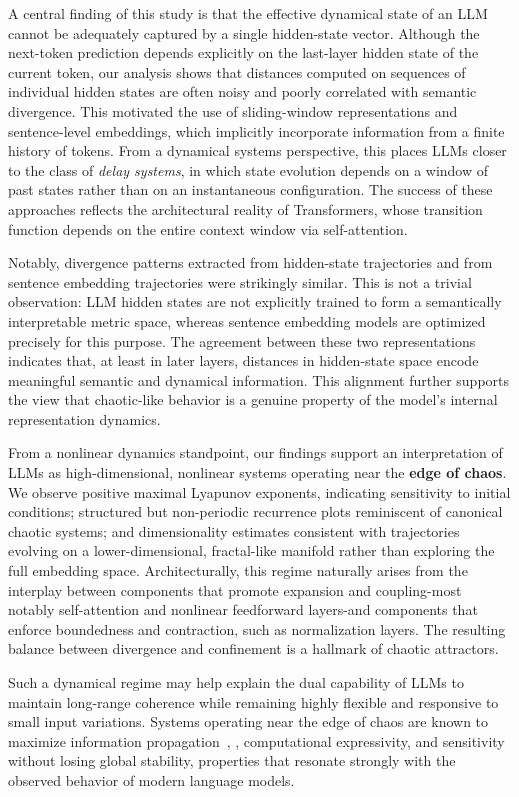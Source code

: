 \documentclass[aip%
 aip,
 amsmath,amssymb,
 reprint,%
]{revtex4-1}
\begin{document}
A central finding of this study is that the effective dynamical state of an LLM cannot be adequately captured by a single hidden-state vector. Although the next-token prediction depends explicitly on the last-layer hidden state of the current token, our analysis shows that distances computed on sequences of individual hidden states are often noisy and poorly correlated with semantic divergence. This motivated the use of sliding-window representations and sentence-level embeddings, which implicitly incorporate information from a finite history of tokens. From a dynamical systems perspective, this places LLMs closer to the class of \emph{delay systems}, in which state evolution depends on a window of past states rather than on an instantaneous configuration. The success of these approaches reflects the architectural reality of Transformers, whose transition function depends on the entire context window via self-attention.

Notably, divergence patterns extracted from hidden-state trajectories and from sentence embedding trajectories were strikingly similar. This is not a trivial observation: LLM hidden states are not explicitly trained to form a semantically interpretable metric space, whereas sentence embedding models are optimized precisely for this purpose. The agreement between these two representations indicates that, at least in later layers, distances in hidden-state space encode meaningful semantic and dynamical information. This alignment further supports the view that chaotic-like behavior is a genuine property of the model’s internal representation dynamics.

From a nonlinear dynamics standpoint, our findings support an interpretation of LLMs as high-dimensional, nonlinear systems operating near the \textbf{edge of chaos}. We observe positive maximal Lyapunov exponents, indicating sensitivity to initial conditions; structured but non-periodic recurrence plots reminiscent of canonical chaotic systems; and dimensionality estimates consistent with trajectories evolving on a lower-dimensional, fractal-like manifold rather than exploring the full embedding space. Architecturally, this regime naturally arises from the interplay between components that promote expansion and coupling-most notably self-attention and nonlinear feedforward layers-and components that enforce boundedness and contraction, such as normalization layers. The resulting balance between divergence and confinement is a hallmark of chaotic attractors.

Such a dynamical regime may help explain the dual capability of LLMs to maintain long-range coherence while remaining highly flexible and responsive to small input variations. Systems operating near the edge of chaos are known to maximize information propagation~\cite{info_edge_chaos}, \cite{LANGTON199012}, computational expressivity, and sensitivity without losing global stability, properties that resonate strongly with the observed behavior of modern language models.
\end{document}
